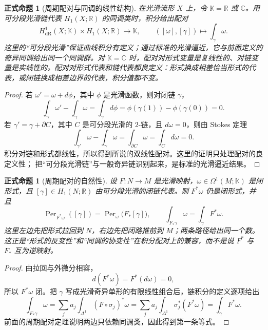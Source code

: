 \documentclass[UTF8,fontset=none,a4paper,11pt]{ctexart}
\theoremstyle{foundation-definition}
\theoremstyle{foundation-theorem}
\theoremstyle{foundation-proposition}
\newtheorem{proposition}[definition]{正式命题}
\theoremstyle{foundation-example}
\theoremstyle{foundation-remark}
\theoremstyle{foundation-theorem}
\begin{document}
\begin{proposition}[周期配对与同调的线性结构]\label{prop:period-pairing}
在光滑流形 \(X\) 上，令 \(\mathbb K=\mathbb R\) 或 \(\mathbb C\)。用可分段光滑链代表
\(H_1(X;\mathbb R)\) 的同调类时，积分给出配对
\[
H^1_{\mathrm{dR}}(X;\mathbb K)\times H_1(X;\mathbb R)
\longrightarrow\mathbb K,\qquad
([\omega],[\gamma])\longmapsto\int_\gamma\omega.
\]
这里的“可分段光滑”保证曲线积分有定义；通过标准的光滑逼近，它与前面定义的奇异同调给出同一个同调群。对 \(\mathbb K=\mathbb C\) 时，配对对形式变量是复线性的、对链变量是实线性的。配对对形式代表和链代表都良定义：形式换成相差恰当形式的代表，或闭链换成相差边界的代表，积分值都不变。
\end{proposition}

\begin{proof}
若 \(\omega'=\omega+d\phi\)，其中 \(\phi\) 是光滑函数，则对闭链 \(\gamma\)，
\[
\int_\gamma\omega'-\int_\gamma\omega
=\int_\gamma d\phi
=\phi(\gamma(1))-\phi(\gamma(0))=0.
\]
若 \(\gamma'=\gamma+\partial C\)，其中 \(C\) 是可分段光滑的 \(2\)-链，且
\(d\omega=0\)，则由 Stokes 定理
\[
\int_{\gamma'}\omega-\int_\gamma\omega
=\int_{\partial C}\omega
=\int_Cd\omega=0.
\]
积分对链和形式都线性，所以得到所说的双线性配对。这里的证明只处理配对的良定义性；
把“可分段光滑链”与一般奇异链识别起来，是标准的光滑逼近结果。
\end{proof}

\begin{proposition}[周期配对的自然性]\label{prop:period-naturality}
设 \(F:N\to M\) 是光滑映射，\(\omega\in\Omega^1(M;\mathbb K)\) 是闭形式，且
\([\gamma]\in H_1(N;\mathbb R)\) 由可分段光滑的闭链代表。则 \(F^*\omega\) 仍是闭形式，并且
\[
\operatorname{Per}_{F^*\omega}([\gamma])
=\operatorname{Per}_{\omega}\bigl(F_*[\gamma]\bigr),
\qquad
\int_{F_*\gamma}\omega=\int_\gamma F^*\omega.
\]
这里左边先把形式拉回到 \(N\)，右边先把闭路推前到 \(M\)；两条路径给出同一个数。
这正是“形式的反变性”和“同调的协变性”在积分配对上的兼容，而不是说 \(F^*\) 与 \(F_*\)
互为逆映射。
\end{proposition}

\begin{proof}
由拉回与外微分相容，
\[
d(F^*\omega)=F^*(d\omega)=0,
\]
所以 \(F^*\omega\) 闭。把 \(\gamma\) 写成光滑奇异单形的有限线性组合后，链积分的定义逐项给出
\[
\int_{F_*\gamma}\omega
=\sum_j a_j\int_{\Delta^1}(F\circ\sigma_j)^*\omega
=\sum_j a_j\int_{\Delta^1}\sigma_j^*(F^*\omega)
=\int_\gamma F^*\omega.
\]
前面的周期配对定理说明两边只依赖同调类，因此得到第一条等式。
\end{proof}
\end{document}
